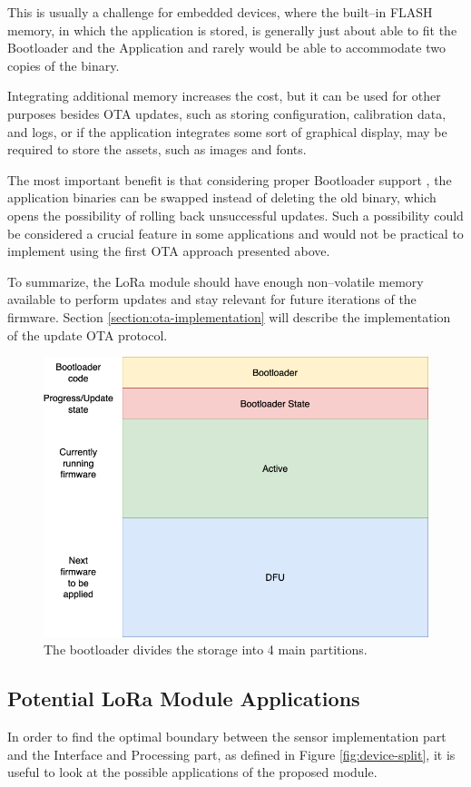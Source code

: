 This is usually a challenge for embedded devices, where the built--in FLASH memory, in which the application is stored, is generally just about able to fit the Bootloader and the Application and rarely would be able to accommodate two copies of the binary.

Integrating additional memory increases the cost, but it can be used for other purposes besides OTA updates, such as storing configuration, calibration data, and logs, or if the application integrates some sort of graphical display, may be required to store the assets, such as images and fonts.

The most important benefit is that considering proper Bootloader support \cite{drogue_iot_firmware_2024,embassy_project_documentation_bootloader_2024}, the application binaries can be swapped instead of deleting the old binary, which opens the possibility of rolling back unsuccessful updates. Such a possibility could be considered a crucial feature in some applications and would not be practical to implement using the first OTA approach presented above.

To summarize, the LoRa module should have enough non--volatile memory available to perform updates and stay relevant for future iterations of the firmware. Section \ref{section:ota-implementation} will describe the implementation of the update OTA protocol.

\begin{figure}
    \includegraphics[width=.6\textwidth]{fig/bootloader_flash.png}
    \caption{\label{fig:bootloader-flash}The bootloader divides the storage into 4 main partitions.}
\end{figure}

\subsection{\label{section:application-case-studies}Potential LoRa Module Applications}
In order to find the optimal boundary between the sensor implementation part and the Interface and Processing part, as defined in Figure \ref{fig:device-split}, it is useful to look at the possible applications of the proposed module.

